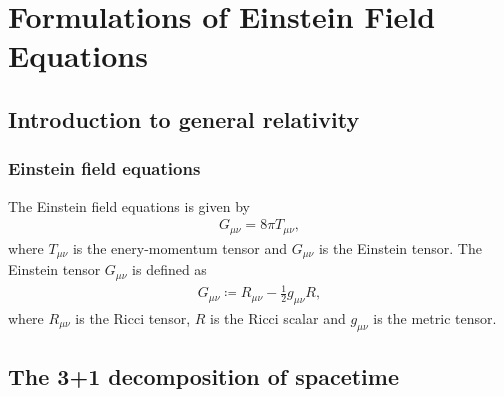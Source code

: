 
\chapter{Formulations of Einstein Field Equations}  %

\ifpdf
    \graphicspath{{Chapter1/Figs/PDF/}{Chapter1/Figs/}}
\else
    \graphicspath{{Chapter1/Figs/}}
\fi


\section{Introduction to general relativity} %
\label{section1.1}

\subsection{Einstein field equations} %
\label{section1.1.1}

The Einstein field equations is given by
\begin{align} \label{eq:Einstein_eq}
    G_{\mu\nu} = 8 \pi T_{\mu\nu},
\end{align}
where $T_{\mu\nu}$ is the enery-momentum tensor and $G_{\mu\nu}$ is the Einstein tensor.
The Einstein tensor $G_{\mu\nu}$ is defined as
\begin{align}
    G_{\mu\nu} \coloneqq R_{\mu\nu} - \frac{1}{2} g_{\mu\nu} R,
\end{align}
where $R_{\mu\nu}$ is the Ricci tensor,
$R$ is the Ricci scalar
and $g_{\mu\nu}$ is the metric tensor.


\section{The 3+1 decomposition of spacetime} %
\label{section1.2}

